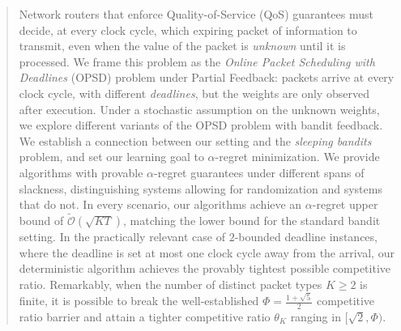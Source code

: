 \begin{abstract}
 Network routers that enforce Quality-of-Service (QoS) guarantees must decide, at every clock cycle, which expiring packet of information to transmit, even when the value of the packet is \textit{unknown} until it is processed. We frame this problem as the \textit{Online Packet Scheduling with Deadlines} (OPSD) problem under Partial Feedback: packets arrive at every clock cycle, with different \textit{deadlines}, but the weights are only observed after execution. Under a stochastic assumption on the unknown weights, we explore different variants of the OPSD problem with bandit feedback. We establish a connection between our setting and the \textit{sleeping bandits} problem, and set our learning goal to $\alpha$-regret minimization. We provide algorithms with provable $\alpha$-regret guarantees under different spans of slackness, distinguishing systems allowing for randomization and systems that do not. In every scenario, our algorithms achieve an $\alpha$-regret upper bound of $\widetilde{\mathcal{O}}\left(\sqrt{KT}\right)$, matching the lower bound for the standard bandit setting. In the practically relevant case of $2$-bounded deadline instances, where the deadline is set at most one clock cycle away from the arrival, our deterministic algorithm achieves the provably tightest possible competitive ratio. Remarkably, when the number of distinct packet types $K\ge 2$ is finite, it is possible to break the well-established $\Phi = \frac{1+\sqrt{5}}{2}$ competitive ratio barrier and attain a tighter competitive ratio $\theta_K$ ranging in $[\sqrt{2}, \Phi)$.
\end{abstract}





